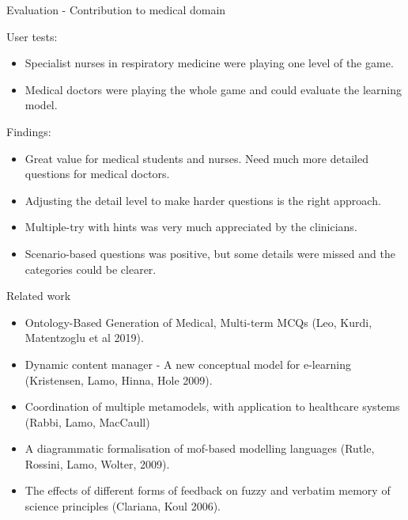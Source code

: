 \documentclass{beamer}
\begin{document}
\begin{frame}{Evaluation - Contribution to medical domain}
\begin{block}{User tests:}
\begin{itemize}
	\item Specialist nurses in respiratory medicine were playing one level of the game.
	\item Medical doctors were playing the whole game and could evaluate the learning model.
\end{itemize}
\end{block}

\begin{block}{Findings:}
\begin{itemize}
	\item Great value for medical students and nurses. Need much more detailed questions for medical doctors.
	\item Adjusting the detail level to make harder questions is the right approach.
	\item Multiple-try with hints was very much appreciated by the clinicians.
	\item Scenario-based questions was positive, but some details were missed and the categories could be clearer.
\end{itemize}
\end{block}
\end{frame}

\begin{frame}{Related work}
\begin{itemize}
	\item Ontology-Based Generation of Medical, Multi-term MCQs (Leo, Kurdi, Matentzoglu et al 2019).
	\item Dynamic content manager - A new conceptual model for e-learning (Kristensen, Lamo, Hinna, Hole 2009).
	\item Coordination of multiple metamodels, with application to healthcare systems (Rabbi, Lamo, MacCaull)
	\item A	diagrammatic formalisation of mof-based modelling languages (Rutle, Rossini, Lamo, Wolter, 2009).
	\item The effects of different forms of	feedback on fuzzy and verbatim memory of science principles (Clariana, Koul 2006).
\end{itemize}
\end{frame}
\end{document}
